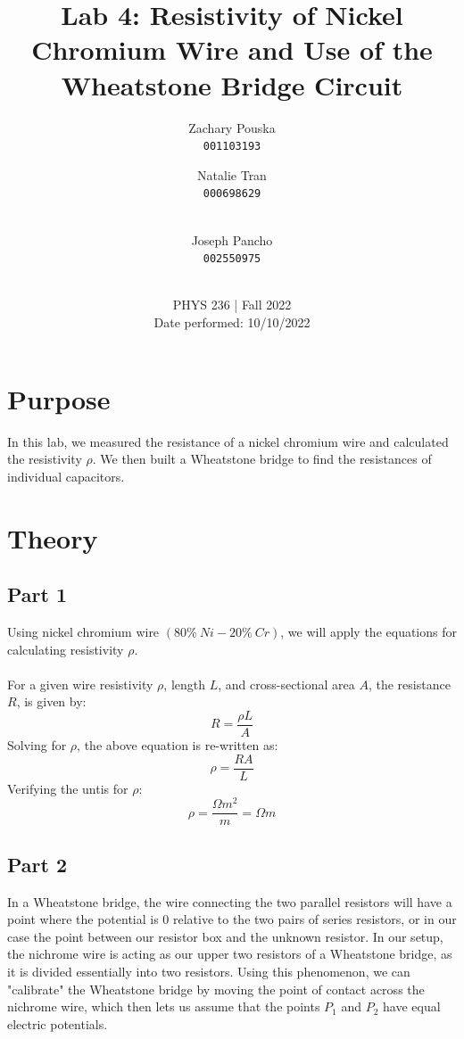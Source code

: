 \documentclass[titlepage]{article}
\begin{document}
\title{\textbf{Lab 4: Resistivity of Nickel Chromium Wire and Use of the Wheatstone Bridge Circuit}}
\author{
    Zachary Pouska\\
    \texttt{001103193}\\
    \and
    Natalie Tran \\ 
    \texttt{000698629}\\ \\
    \and
    Joseph Pancho\\
    \texttt{002550975} \\ \\
} 

\date{PHYS 236 | Fall 2022\\
Date performed: 10/10/2022}


	\maketitle



	\section{Purpose}
	In this lab, we measured the resistance of a nickel chromium wire 
	and calculated the resistivity $\rho$. We then built a Wheatstone 
	bridge to find the resistances of individual capacitors.

	\section{Theory}
        \subsection{Part 1} 
	Using nickel chromium wire $(80\%~Ni- 20\%~Cr)$, we will apply the 
	equations for calculating resistivity $\rho$. \\
	~\\
	For a given wire resistivity $\rho$, length $L$, and cross-sectional 
	area $A$, the resistance $R$, is given by: \\
	\[
		R=\frac{\rho L}{A}
	\]
	Solving for $\rho$, the above equation is re-written as:
	\[
		\rho = \frac{RA}{L}
	\]	 
	Verifying the untis for $\rho$: 
	\[
		\rho=\frac{\Omega m^2}{m}=\Omega m	
	\]

    \subsection{Part 2} 
        In a Wheatstone bridge, the wire connecting the two parallel resistors will have a point where the potential is 0 relative to the two pairs of series resistors, or in our case the point between our resistor box and the unknown resistor. In our setup, the nichrome wire is acting as our upper two resistors of a Wheatstone bridge, as it is divided essentially into two resistors. Using this phenomenon, we can "calibrate" the Wheatstone bridge by moving the point of contact across the nichrome wire, which then lets us assume that the points $P_1$ and $P_2$ have equal electric potentials. 
\end{document}
